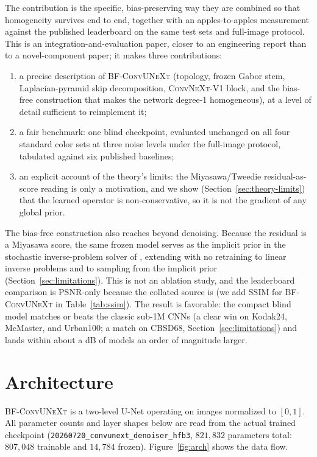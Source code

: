 \documentclass{article}
\newcommand{\model}{\textsc{BF-ConvUNeXt}}
\newcommand{\convnext}{\textsc{ConvNeXt}}
\begin{document}
The contribution is the specific, bias-preserving way they are combined so that homogeneity survives end to end, together with an apples-to-apples measurement against the published leaderboard on the same test sets and full-image protocol. This is an integration-and-evaluation paper, closer to an engineering report than to a novel-component paper; it makes three contributions:

\begin{enumerate}
  \item a precise description of \model{} (topology, frozen Gabor stem, Laplacian-pyramid skip decomposition, \convnext{}-V1 block, and the bias-free construction that makes the network degree-1 homogeneous), at a level of detail sufficient to reimplement it;
  \item a fair benchmark: one blind checkpoint, evaluated unchanged on all four standard color sets at three noise levels under the full-image protocol, tabulated against six published baselines;
  \item an explicit account of the theory's limits: the Miyasawa/Tweedie residual-as-score reading is only a motivation, and we show (Section~\ref{sec:theory-limits}) that the learned operator is non-conservative, so it is not the gradient of any global prior.
\end{enumerate}

The bias-free construction also reaches beyond denoising. Because the residual is a Miyasawa score, the same frozen model serves as the implicit prior in the stochastic inverse-problem solver of \citet{kadkhodaie2021stochastic}, extending with no retraining to linear inverse problems and to sampling from the implicit prior (Section~\ref{sec:limitations}). This is not an ablation study, and the leaderboard comparison is PSNR-only because the collated source is (we add SSIM for \model{} in Table~\ref{tab:ssim}). The result is favorable: the compact blind model matches or beats the classic sub-1M CNNs (a clear win on Kodak24, McMaster, and Urban100; a match on CBSD68, Section~\ref{sec:limitations}) and lands within about a dB of models an order of magnitude larger.

\clearpage
\section{Architecture}
\label{sec:arch}

\model{} is a two-level U-Net operating on images normalized to $[0,1]$. All parameter counts and layer shapes below are read from the actual trained checkpoint (\texttt{20260720\_convunext\_denoiser\_hfb3}, $821{,}832$ parameters total: $807{,}048$ trainable and $14{,}784$ frozen). Figure~\ref{fig:arch} shows the data flow.
\end{document}
